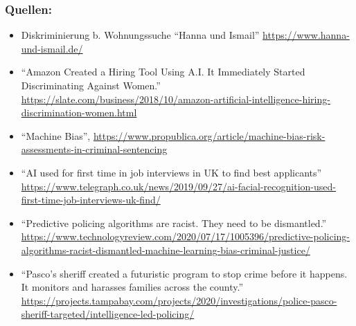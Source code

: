 \documentclass[aspectratio=169,usenames,dvipsnames]{beamer}
\begin{document}
\begin{frame}
\frametitle{Quellen:}
\scriptsize
\begin{itemize}
\item Diskriminierung b. Wohnungssuche ``Hanna und Ismail'' \url{https://www.hanna-und-ismail.de/}

\item ``Amazon Created a Hiring Tool Using A.I. It Immediately Started Discriminating Against Women.'' \url{https://slate.com/business/2018/10/amazon-artificial-intelligence-hiring-discrimination-women.html}

\item ``Machine Bias'', \url{https://www.propublica.org/article/machine-bias-risk-assessments-in-criminal-sentencing}

\item ``AI used for first time in job interviews in UK to find best applicants'' \url{https://www.telegraph.co.uk/news/2019/09/27/ai-facial-recognition-used-first-time-job-interviews-uk-find/}

\item ``Predictive policing algorithms are racist. They need to be dismantled.'' \url{https://www.technologyreview.com/2020/07/17/1005396/predictive-policing-algorithms-racist-dismantled-machine-learning-bias-criminal-justice/}

\item ``Pasco’s sheriff created a futuristic program to stop crime before it happens. It monitors and harasses families across the county.'' \url{https://projects.tampabay.com/projects/2020/investigations/police-pasco-sheriff-targeted/intelligence-led-policing/}

\end{itemize}
\end{frame}
\end{document}

